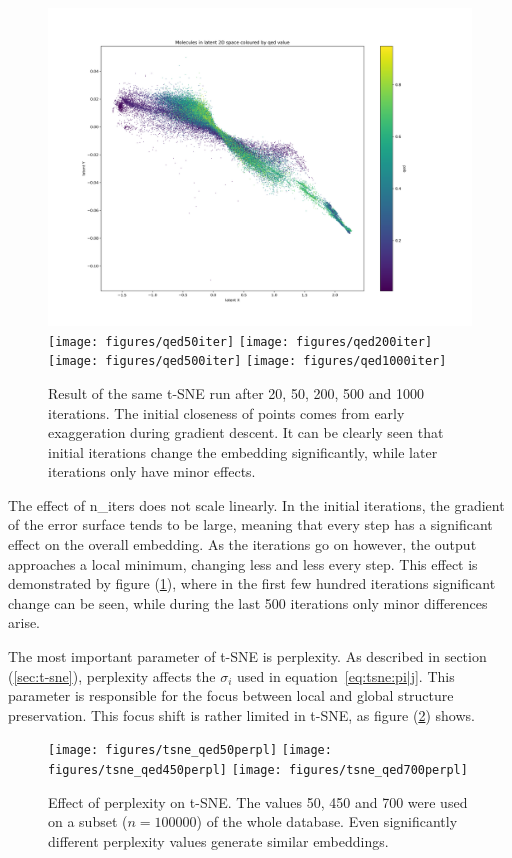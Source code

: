 \begin{figure}[!h]
	\centering
	\includegraphics[width=0.45\columnwidth]{figures/qed20iter}
	\texttt{[image: figures/qed50iter]}
	\texttt{[image: figures/qed200iter]}
	\texttt{[image: figures/qed500iter]}
	\texttt{[image: figures/qed1000iter]}
	\caption{Result of the same t-SNE run after 20, 50, 200, 500 and 1000 iterations. The initial closeness of points comes from early exaggeration during gradient descent. It can be clearly seen that initial iterations change the embedding significantly, while later iterations only have minor effects.}
	\label{fig:tsne:iter_sweep}
\end{figure}

The effect of n\_iters does not scale linearly. In the initial iterations, the gradient of the error surface tends to be large, meaning that every step has a significant effect on the overall embedding. As the iterations go on however, the output approaches a local minimum, changing less and less every step. This effect is demonstrated by figure (\ref{fig:tsne:iter_sweep}), where in the first few hundred iterations significant change can be seen, while during the last 500 iterations only minor differences arise.

The most important parameter of t-SNE is perplexity. As described in section (\ref{sec:t-sne}), perplexity affects the $\sigma_i$ used in equation~\eqref{eq:tsne:pi|j}. This parameter is responsible for the focus between local and global structure preservation. This focus shift is rather limited in t-SNE, as figure (\ref{fig:tsne:perplexity}) shows.

\begin{figure}[!h]
	\centering
	\texttt{[image: figures/tsne\_qed50perpl]}
	\texttt{[image: figures/tsne\_qed450perpl]}
	\texttt{[image: figures/tsne\_qed700perpl]}
	\caption{Effect of perplexity on t-SNE. The values 50, 450 and 700 were used on a subset ($n = 100000$) of the whole database. Even significantly different perplexity values generate similar embeddings.}
	\label{fig:tsne:perplexity}
\end{figure}

